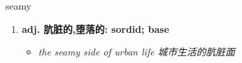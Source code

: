
\begin{frame}
{\huge seamy}
\begin{center}
\begin{enumerate}\Large
  \item \textbf{adj. 肮脏的,堕落的: sordid; base}
  \begin{itemize}
    \item \em{\Large{the seamy side of urban life 城市生活的肮脏面}}
  \end{itemize}
\end{enumerate}
\end{center}
\end{frame}
